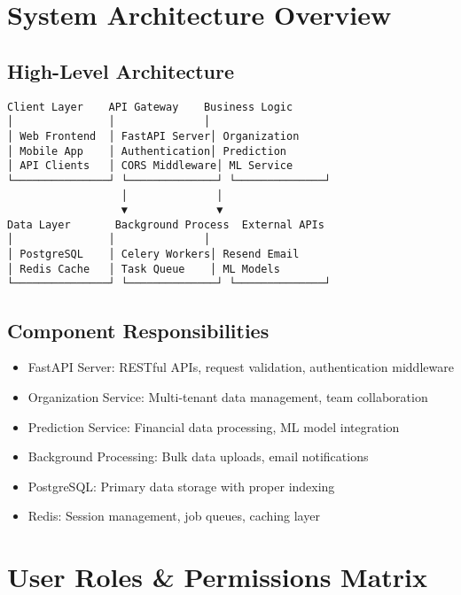 \documentclass[a4paper,12pt]{article}
\newcommand{\sectionbreak}{\clearpage}
\newcommand{\subitem}[1]{\item[\textbullet] #1}
\begin{document}
\sectionbreak

\section*{System Architecture Overview}

\subsection*{High-Level Architecture}
\begin{verbatim}
Client Layer    API Gateway    Business Logic
│               │              │
│ Web Frontend  │ FastAPI Server│ Organization
│ Mobile App    │ Authentication│ Prediction
│ API Clients   │ CORS Middleware│ ML Service
└───────────────┘ └──────────────┘ └──────────────┘
                  │              │
                  ▼              ▼
Data Layer       Background Process  External APIs
│               │              │
│ PostgreSQL    │ Celery Workers│ Resend Email
│ Redis Cache   │ Task Queue    │ ML Models
└───────────────┘ └──────────────┘ └──────────────┘
\end{verbatim}

\subsection*{Component Responsibilities}
\begin{itemize}
    \subitem FastAPI Server: RESTful APIs, request validation, authentication middleware
    \subitem Organization Service: Multi-tenant data management, team collaboration
    \subitem Prediction Service: Financial data processing, ML model integration
    \subitem Background Processing: Bulk data uploads, email notifications
    \subitem PostgreSQL: Primary data storage with proper indexing
    \subitem Redis: Session management, job queues, caching layer
\end{itemize}

\sectionbreak

\section*{User Roles \& Permissions Matrix}
\end{document}
